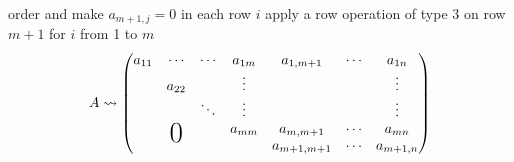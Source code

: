 \begin{enumerate}
\begin{enumerate}
order and make $a_{m+1,j} = 0 $ in each row $i$ apply a row operation
of type 3 on row $m+1$ for $i$ from 1 to $m$
\begin{equation}
A \leadsto 
\begin{pmatrix}
a_{11} & \cdots & \cdots & a_{1m} & a_{1,m+1} & \cdots & a_{1n}\\
& a_{22} & & \vdots &  & & \vdots\\
& & \ddots & \vdots&  & & \vdots\\
& \bigzero& & a_{mm}& a_{m,m+1} & \cdots & a_{mn}\\
& &&& a_{m+1,m+1} & \cdots & a_{m+1,n}
\end{pmatrix}
\end{equation}
\end{enumerate}
\end{enumerate}
